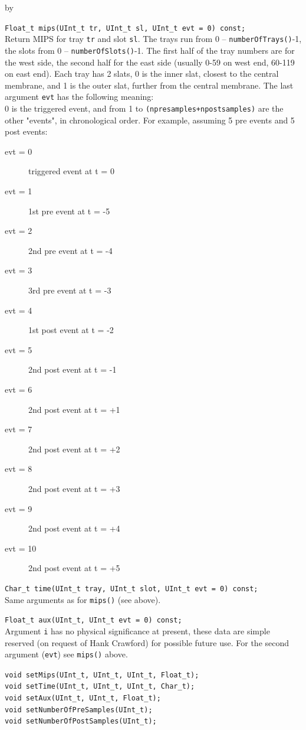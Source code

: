 \documentclass[twoside]{article}
\newcommand{\entrylabel}[1]{\mbox{\textbf{{#1}}}\hfil}%
\newenvironment{entry}
{\begin{list}{}%
    {\renewcommand{\makelabel}{\entrylabel}%
     \setlength{\labelwidth}{90pt}%
     \setlength{\leftmargin}{\labelwidth}
     \advance\leftmargin by \labelsep%
      }%
    }%
  {\end{list}}
\newcommand{\Entrylabel}[1]%
{\raisebox{0pt}[1ex][0pt]{\makebox[\labelwidth][l]%
    {\parbox[t]{\labelwidth}{\hspace{0pt}\textbf{{#1}}}}}}
\newenvironment{Entry}%
{\renewcommand{\entrylabel}{\Entrylabel}\begin{entry}}%
  {\end{entry}}
\begin{document}
\begin{Entry}
    \verb+Float_t mips(UInt_t tr, UInt_t sl, UInt_t evt = 0) const;+\\
    Return MIPS for tray \texttt{tr} and slot \texttt{sl}.  The trays
    run from 0 -- \texttt{numberOfTrays()}-1, the slots from 0 --
    \texttt{numberOfSlots()}-1. The first half of the tray numbers are
    for the west side, the second half for the east side (usually 0-59
    on west end, 60-119 on east end).  Each tray has 2 slats, 0 is the
    inner slat, closest to the central membrane, and 1 is the outer
    slat, further from the central membrane.  The last argument
    \texttt{evt} has  the following meaning:\\
    0 is the triggered event, and
    from 1 to \texttt{(npresamples+npostsamples)} are the other "events",
    in chronological order.  For example, assuming 5 pre events and 5
    post events:
    \begin{description}
    \item[evt = 0] triggered event at t = 0
    \item[evt = 1] 1st pre event at t = -5
    \item[evt = 2] 2nd pre event at t = -4
    \item[evt = 3] 3rd pre event at t = -3
    \item[evt = 4] 1st post event at t = -2
    \item[evt = 5] 2nd post event at t = -1
    \item[evt = 6] 2nd post event at t = +1
    \item[evt = 7] 2nd post event at t = +2
    \item[evt = 8] 2nd post event at t = +3
    \item[evt = 9] 2nd post event at t = +4
    \item[evt = 10] 2nd post event at t = +5
    \end{description}
    
    \verb+Char_t time(UInt_t tray, UInt_t slot, UInt_t evt = 0) const;+\\
    Same arguments as for \texttt{mips()} (see above).
     
    \verb+Float_t aux(UInt_t, UInt_t evt = 0) const;+\\
    Argument \texttt{i} has no physical significance at present, these
    data are simple reserved (on request of Hank Crawford) for
    possible future use.  For the second argument (\texttt{evt}) see
    \texttt{mips()} above.

    \verb+void setMips(UInt_t, UInt_t, UInt_t, Float_t);+\\
    \verb+void setTime(UInt_t, UInt_t, UInt_t, Char_t);+\\
    \verb+void setAux(UInt_t, UInt_t, Float_t);+\\
    \verb+void setNumberOfPreSamples(UInt_t);+\\
    \verb+void setNumberOfPostSamples(UInt_t);+\\
\end{Entry}
\clearpage
\end{document}
